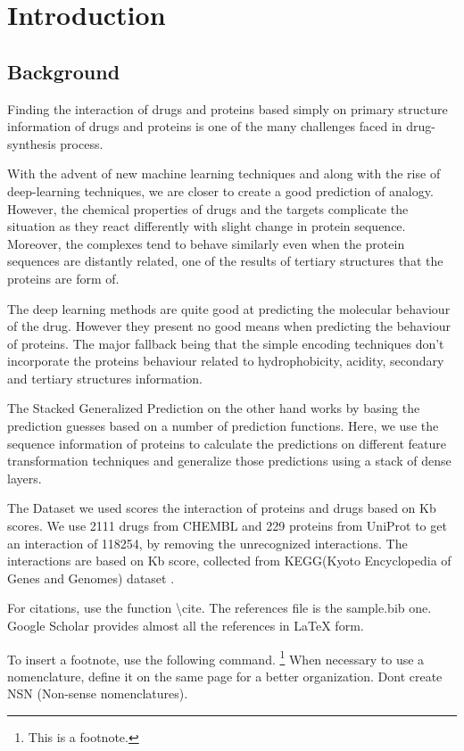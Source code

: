 \chapter{Introduction}


\section{Background}
Finding the interaction of drugs and proteins based simply on primary structure information of drugs and proteins is one of the many challenges faced in drug-synthesis process.

With the advent of new machine learning techniques and along with the rise of deep-learning techniques, we are closer to create a good prediction of analogy.
However, the chemical properties of drugs and the targets complicate the situation as they react differently with slight change in protein sequence. Moreover, the complexes tend to behave similarly even when the protein sequences are distantly related, one of the results of tertiary structures that the proteins are form of.

The deep learning methods are quite good at predicting the molecular behaviour of the drug. However they present no good means when predicting the behaviour of proteins. The major fallback being that the simple encoding techniques don’t incorporate the proteins behaviour related to hydrophobicity, acidity, secondary and tertiary structures information.

The Stacked Generalized Prediction on the other hand works by basing the prediction guesses based on a number of prediction functions. Here, we use the sequence information of proteins to calculate the predictions on different feature transformation techniques and generalize those predictions using a stack of dense layers.

The Dataset we used scores the interaction of proteins and drugs based on Kb scores. We use 2111 drugs from CHEMBL and 229 proteins from UniProt to get an interaction of 118254, by removing the unrecognized interactions. The interactions are based on Kb score, collected from KEGG(​Kyoto Encyclopedia of Genes and Genomes)​ dataset \cite{Kanehisa2000}.

\iffalse

For citations, use the function \textbackslash cite. \cite{gowar1989power} The references file is the sample.bib one. Google Scholar provides almost all the references in LaTeX form.

To insert a footnote, use the following command. \footnote{This is a footnote.} When necessary to use a nomenclature, define it on the same page for a better organization. Dont create NSN (Non-sense nomenclatures).

